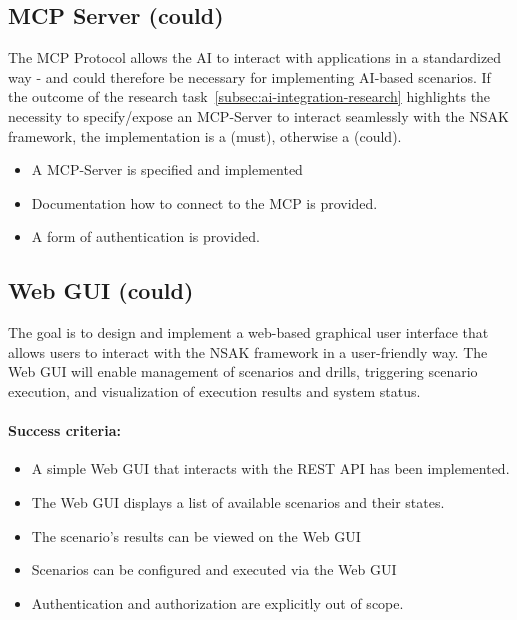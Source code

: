 \subsection{MCP Server (could)}\label{subsec:mcp-server}

The \gls{MCP} Protocol allows the \gls{AI} to interact with applications in a standardized way - and could therefore be necessary for implementing \gls{AI}-based scenarios.
If the outcome of the research task~\ref{subsec:ai-integration-research} highlights the necessity to specify/expose an \gls{MCP}-Server to interact seamlessly with the \gls{NSAK} framework, the implementation is a (must), otherwise a (could).

\begin{itemize}
	\item A \gls{MCP}-Server is specified and implemented
	\item Documentation how to connect to the \gls{MCP} is provided.
	\item A form of authentication is provided.
\end{itemize}

\subsection{Web GUI (could)}\label{subsec:web-gui}

The goal is to design and implement a web-based graphical user interface that allows users to interact with the \gls{NSAK} framework in a user-friendly way.
The Web \gls{GUI} will enable management of scenarios and drills, triggering scenario execution, and visualization of execution results and system status.

\paragraph{Success criteria:}

\begin{itemize}
	\item A simple Web \gls{GUI} that interacts with the REST \gls{API} has been implemented.
	\item The Web \gls{GUI} displays a list of available scenarios and their states.
	\item The scenario's results can be viewed on the Web \gls{GUI}
	\item Scenarios can be configured and executed via the Web \gls{GUI}
	\item Authentication and authorization are explicitly out of scope.
\end{itemize}
\newpage

